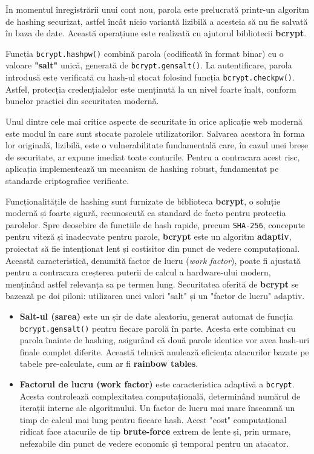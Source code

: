 \documentclass[12pt, a4paper, oneside, romanian]{teza-upb}
\begin{document}
În momentul înregistrării unui cont nou, parola este prelucrată printr-un algoritm de hashing securizat, astfel încât nicio variantă lizibilă a acesteia să nu fie salvată în baza de date. Această operațiune este realizată cu ajutorul bibliotecii \textbf{bcrypt}.

 Funcția \texttt{bcrypt.hashpw()} combină parola (codificată în format binar) cu o valoare \textbf{"salt"} unică, generată de \texttt{bcrypt.gensalt()}. La autentificare, parola introdusă este verificată cu hash-ul stocat folosind funcția \texttt{bcrypt.checkpw()}. Astfel, protecția credențialelor este menținută la un nivel foarte înalt, conform bunelor practici din securitatea modernă.


Unul dintre cele mai critice aspecte de securitate în orice aplicație web modernă este modul în care sunt stocate parolele utilizatorilor. Salvarea acestora în forma lor originală, lizibilă, este o vulnerabilitate fundamentală care, în cazul unei breșe de securitate, ar expune imediat toate conturile. Pentru a contracara acest risc, aplicația implementează un mecanism de hashing robust, fundamentat pe standarde criptografice verificate.

Funcționalitățile de hashing sunt furnizate de biblioteca \textbf{bcrypt}, o soluție modernă și foarte sigură, recunoscută ca standard de facto pentru protecția parolelor. Spre deosebire de funcțiile de hash rapide, precum \texttt{SHA-256}, concepute pentru viteză și inadecvate pentru parole, \textbf{bcrypt} este un algoritm \textbf{adaptiv}, proiectat să fie intenționat lent și costisitor din punct de vedere computațional. Această caracteristică, denumită factor de lucru (\textit{work factor}), poate fi ajustată pentru a contracara creșterea puterii de calcul a hardware-ului modern, menținând astfel relevanța sa pe termen lung.
Securitatea oferită de \textbf{bcrypt} se bazează pe doi piloni: utilizarea unei valori "salt" și un "factor de lucru" adaptiv.
\begin{itemize}
	\item \textbf{Salt-ul (sarea)} este un șir de date aleatoriu, generat automat de funcția \texttt{bcrypt.gensalt()} pentru fiecare parolă în parte. Acesta este combinat cu parola înainte de hashing, asigurând că două parole identice vor avea hash-uri finale complet diferite. Această tehnică anulează eficiența atacurilor bazate pe tabele pre-calculate, cum ar fi \textbf{rainbow tables}.
	
	\item \textbf{Factorul de lucru (work factor)} este caracteristica adaptivă a \texttt{bcrypt}. Acesta controlează complexitatea computațională, determinând numărul de iterații interne ale algoritmului. Un factor de lucru mai mare înseamnă un timp de calcul mai lung pentru fiecare hash. Acest "cost" computațional ridicat face atacurile de tip \textbf{brute-force} extrem de lente și, prin urmare, nefezabile din punct de vedere economic și temporal pentru un atacator.
\end{itemize}
\end{document}
